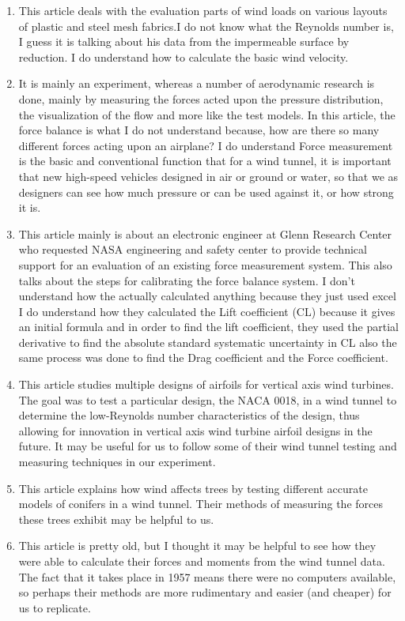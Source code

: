 \documentclass[12pt,letterpaper]{article}
\begin{document}
\begin{enumerate}
	\item \cite{Hubova2019} This article deals with the evaluation parts of wind loads on various layouts of plastic and steel mesh fabrics.I do not know what the Reynolds number is, I guess it is talking about his data from the impermeable surface by reduction.
	I do understand how to calculate the basic wind velocity.
	
	\item \cite{Yan2009} It is mainly an experiment, whereas a number of aerodynamic research is done, mainly by measuring the forces acted upon the pressure distribution, the visualization of the flow and more like the test models. 
	In this article, the force balance is what I do not understand because, how are there so many different forces acting upon an airplane?
	I do understand Force measurement is the basic and conventional function that for a wind tunnel, it is important that new high-speed vehicles designed in air or ground or water, so that we as designers can see how much pressure or can be used against it, or how strong it is.
	
	\item \cite{robert2012} This article mainly is about an electronic engineer at Glenn Research Center who requested NASA engineering and safety center to provide technical support for an evaluation of an existing force measurement system.
	This also talks about the steps for calibrating the force balance system.
	I don’t understand how the actually calculated anything because they just used excel
	I do understand how they calculated the Lift coefficient (CL) because it gives an initial formula and in order to find the lift coefficient, they used the partial derivative to find the absolute standard systematic uncertainty in  CL also the same process was done to find the Drag coefficient and the Force coefficient.

	\item\cite{Rudnicki2004} This article studies multiple designs of airfoils for vertical axis wind turbines. The goal was to test a particular design, the NACA 0018, in a wind tunnel to determine the low-Reynolds number characteristics of the design, thus allowing for innovation in vertical axis wind turbine airfoil designs in the future. It may be useful for us to follow some of their wind tunnel testing and measuring techniques in our experiment.
	
	\item \cite{Rudnicki2004} This article explains how wind affects trees by testing different accurate models of conifers in a wind tunnel. Their methods of measuring the forces these trees exhibit may be helpful to us.
	
	\item \cite{Guilbaud1957} This article is pretty old, but I thought it may be helpful to see how they were able to calculate their forces and moments from the wind tunnel data. The fact that it takes place in 1957 means there were no computers available, so perhaps their methods are more rudimentary and easier (and cheaper) for us to replicate.
	
\end{enumerate}

\printbibliography
\end{document}
